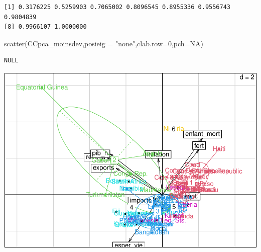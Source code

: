 \documentclass[
]{article}
\newenvironment{Shaded}{}{}
\newcommand{\AttributeTok}[1]{#1}
\newcommand{\ConstantTok}[1]{#1}
\newcommand{\DecValTok}[1]{#1}
\newcommand{\FunctionTok}[1]{#1}
\newcommand{\NormalTok}[1]{#1}
\newcommand{\SpecialCharTok}[1]{\textcolor[rgb]{0.00,0.50,0.50}{#1}}
\newcommand{\StringTok}[1]{\textcolor[rgb]{0.00,0.50,0.50}{#1}}
\begin{document}
\begin{verbatim}
[1] 0.3176225 0.5259903 0.7065002 0.8096545 0.8955336 0.9556743 0.9804839
[8] 0.9966107 1.0000000
\end{verbatim}

\begin{Shaded}
\begin{Highlighting}[]
\FunctionTok{scatter}\NormalTok{(CCpca\_moinsdev,}\AttributeTok{posieig =} \StringTok{"none"}\NormalTok{,}\AttributeTok{clab.row=}\DecValTok{0}\NormalTok{,}\AttributeTok{pch=}\ConstantTok{NA}\NormalTok{)}
\end{Highlighting}
\end{Shaded}

\begin{verbatim}
NULL
\end{verbatim}

\begin{Shaded}
\end{Shaded}

\includegraphics{Projet_files/figure-latex/unnamed-chunk-41-1.pdf}
\end{document}
